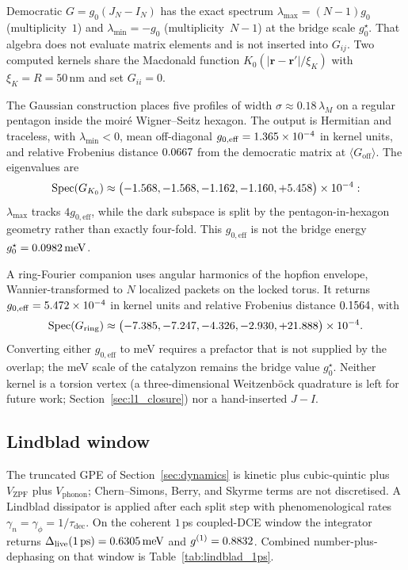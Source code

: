 Democratic $G=g_0(J_N-I_N)$ has the exact spectrum $\lambda_{\max}=(N-1)g_0$ (multiplicity~$1$) and $\lambda_{\min}=-g_0$ (multiplicity~$N-1$) at the bridge scale $g_0^\star$. That algebra does not evaluate matrix elements and is not inserted into $G_{ij}$. Two computed kernels share the Macdonald function $K_0(|\mathbf{r}-\mathbf{r}'|/\xi_K)$ with $\xi_K=R=50$\,nm and set $G_{ii}=0$.

The Gaussian construction places five profiles of width $\sigma\approx 0.18\,\lambda_M$ on a regular pentagon inside the moir\'e Wigner--Seitz hexagon. The output is Hermitian and traceless, with $\lambda_{\min}<0$, mean off-diagonal $g_{0,\mathrm{eff}}=1.365\times 10^{-4}$ in kernel units, and relative Frobenius distance $0.0667$ from the democratic matrix at $\langle G_{\mathrm{off}}\rangle$. The eigenvalues are
\begin{equation}
\mathrm{Spec}(G_{K_0})\approx
\bigl(-1.568,-1.568,-1.162,-1.160,+5.458\bigr)\times 10^{-4}:
\end{equation}
$\lambda_{\max}$ tracks $4g_{0,\mathrm{eff}}$, while the dark subspace is split by the pentagon-in-hexagon geometry rather than exactly four-fold. This $g_{0,\mathrm{eff}}$ is not the bridge energy $g_0^\star=0.0982\,\mathrm{meV}$.

A ring-Fourier companion uses angular harmonics of the hopfion envelope, Wannier-transformed to $N$ localized packets on the locked torus. It returns $g_{0,\mathrm{eff}}=5.472\times 10^{-4}$ in kernel units and relative Frobenius distance $0.1564$, with
\begin{equation}
\mathrm{Spec}(G_{\mathrm{ring}})\approx
\bigl(-7.385,-7.247,-4.326,-2.930,+21.888\bigr)\times 10^{-4}.
\end{equation}
Converting either $g_{0,\mathrm{eff}}$ to meV requires a prefactor that is not supplied by the overlap; the meV scale of the catalyzon remains the bridge value $g_0^\star$. Neither kernel is a torsion vertex (a three-dimensional Weitzenb\"ock quadrature is left for future work; Section~\ref{sec:l1_closure}) nor a hand-inserted $J-I$.

\subsection{Lindblad window}
\label{sec:lindblad_dict}

The truncated GPE of Section~\ref{sec:dynamics} is kinetic plus cubic-quintic plus $V_{\mathrm{ZPF}}$ plus $V_{\mathrm{phonon}}$; Chern--Simons, Berry, and Skyrme terms are not discretised. A Lindblad dissipator is applied after each split step with phenomenological rates $\gamma_n=\gamma_{\phi}=1/\tau_{\mathrm{dec}}$. On the coherent $1$\,ps coupled-DCE window the integrator returns $\Delta_{\mathrm{live}}(1\,\mathrm{ps})=0.6305\,\mathrm{meV}$ and $g^{(1)}=0.8832$. Combined number-plus-dephasing on that window is Table~\ref{tab:lindblad_1ps}.

